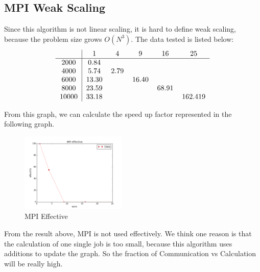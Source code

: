 \subsection{MPI Weak Scaling}
Since this algorithm is not linear scaling, it is hard to define weak scaling, because the problem size grows $O(N^{3})$.
The data tested is listed below:
\begin{equation*}
\begin{tabular}{c|ccccc}
      & 1      & 4 & 9 & 16 & 25       \\
\hline 
2000  & 0.84   &   &   &    &          \\
4000  & 5.74  &  2.79 &   &   &       \\
6000  & 13.30  &   &  16.40 &    &     \\
8000  & 23.59   &   &   &  68.91  &    \\
10000 & 33.18   &   &   &    &  162.419  \\
\end{tabular}
\end{equation*}

From this graph, we can calculate the speed up factor represented in the following graph.
\begin{figure}[H]
    \centering
    \includegraphics[width=0.45\textwidth]{figs/MPI_effective.png}
    \caption{MPI Effective}
\end{figure}

From the result above, MPI is not used effectively. We think one reason is that the calculation of
one single job is too small, because this algorithm uses additions to update the graph. So the
fraction of Communication vs Calculation will be really high. \\